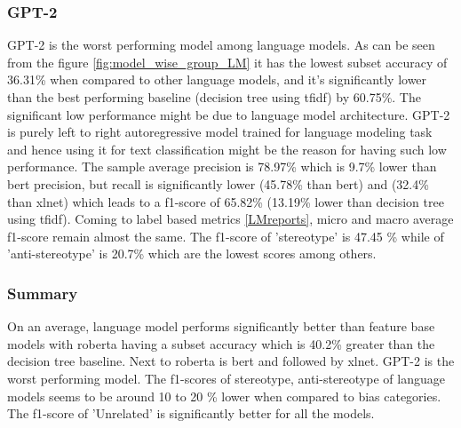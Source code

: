 \subsubsection{GPT-2}
GPT-2 is the worst performing model among language models. As can be seen from the figure \ref{fig:model_wise_group_LM} it has the lowest subset accuracy of 36.31\% when compared to other language models, and it's significantly lower than the best performing baseline (decision tree using \acrshort{tfidf}) by 60.75\%. The significant low performance might be due to language model architecture. GPT-2 is purely left to right autoregressive model trained for language modeling task and hence using it for text classification might be the reason for having such low performance. The sample average precision is 78.97\% which is 9.7\% lower than bert precision, but recall is significantly lower (45.78\% than bert) and  (32.4\% than xlnet) which leads to a f1-score of 65.82\% (13.19\% lower than decision tree using \acrshort{tfidf}). Coming to label based metrics \ref{LMreports}, micro and macro average f1-score remain almost the same. The f1-score of 'stereotype' is 47.45 \% while of 'anti-stereotype' is 20.7\% which are the lowest scores among others. 

\subsubsection{Summary}
On an average, language model performs significantly better than feature base models with roberta having a subset accuracy which is 40.2\% greater than the decision tree baseline. Next to roberta is bert and followed by xlnet. GPT-2 is the worst performing model. The f1-scores of stereotype, anti-stereotype of language models seems to be around 10 to 20 \% lower when compared to bias categories. The f1-score of 'Unrelated' is significantly better for all the models.

